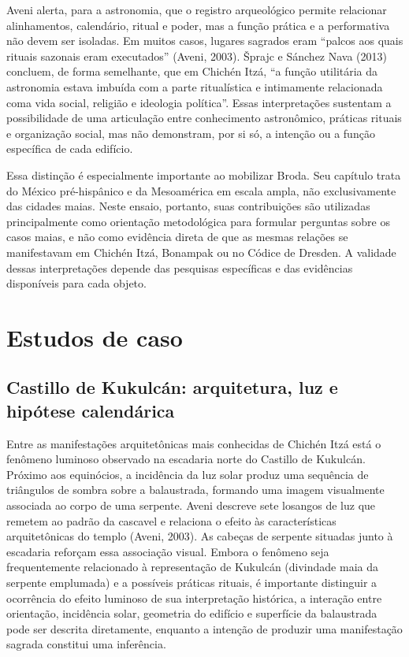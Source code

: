 \documentclass[11pt, a4paper]{article}
\begin{document}
Aveni alerta, para a astronomia, que o registro arqueológico permite relacionar alinhamentos, calendário, ritual e poder, mas a função prática e a performativa não devem ser isoladas. Em muitos casos, lugares sagrados eram “palcos aos quais rituais sazonais eram executados” (Aveni, 2003). Šprajc e Sánchez Nava (2013) concluem, de forma semelhante, que em Chichén Itzá, “a função utilitária da astronomia estava imbuída com a parte ritualística e intimamente relacionada coma vida social, religião e ideologia política”. Essas interpretações sustentam a possibilidade de uma articulação entre conhecimento astronômico, práticas rituais e organização social, mas não demonstram, por si só, a intenção ou a função específica de cada edifício.

Essa distinção é especialmente importante ao mobilizar Broda. Seu capítulo trata do México pré-hispânico e da Mesoamérica em escala ampla, não exclusivamente das cidades maias. Neste ensaio, portanto, suas contribuições são utilizadas principalmente como orientação metodológica para formular perguntas sobre os casos maias, e não como evidência direta de que as mesmas relações se manifestavam em Chichén Itzá, Bonampak ou no Códice de Dresden. A validade dessas interpretações depende das pesquisas específicas e das evidências disponíveis para cada objeto.

\section{Estudos de caso}

\subsection{ Castillo de Kukulcán: arquitetura, luz e hipótese calendárica}

Entre as manifestações arquitetônicas mais conhecidas de Chichén Itzá está o fenômeno luminoso observado na escadaria norte do Castillo de Kukulcán. Próximo aos equinócios, a incidência da luz solar produz uma sequência de triângulos de sombra sobre a balaustrada, formando uma imagem visualmente associada ao corpo de uma serpente. Aveni descreve sete losangos de luz que remetem ao padrão da cascavel e relaciona o efeito às características arquitetônicas do templo (Aveni, 2003). As cabeças de serpente situadas junto à escadaria reforçam essa associação visual. Embora o fenômeno seja frequentemente relacionado à representação de Kukulcán (divindade maia da serpente emplumada) e a possíveis práticas rituais, é importante distinguir a ocorrência do efeito luminoso de sua interpretação histórica, a interação entre orientação, incidência solar, geometria do edifício e superfície da balaustrada pode ser descrita diretamente, enquanto a intenção de produzir uma manifestação sagrada constitui uma inferência.
\end{document}
